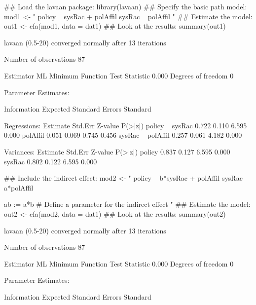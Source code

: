 \begin{Schunk}
\begin{Sinput}
 ## Load the lavaan package:
 library(lavaan)
 ## Specify the basic path model:
 mod1 <- "
 policy ~ sysRac + polAffil
 sysRac ~ polAffil
 "
 ## Estimate the model:
 out1 <- cfa(mod1, data = dat1)
 ## Look at the results:
 summary(out1)
\end{Sinput}
\begin{Soutput}
lavaan (0.5-20) converged normally after  13 iterations

  Number of observations                            87

  Estimator                                         ML
  Minimum Function Test Statistic                0.000
  Degrees of freedom                                 0

Parameter Estimates:

  Information                                 Expected
  Standard Errors                             Standard

Regressions:
                   Estimate  Std.Err  Z-value  P(>|z|)
  policy ~                                            
    sysRac            0.722    0.110    6.595    0.000
    polAffil          0.051    0.069    0.745    0.456
  sysRac ~                                            
    polAffil          0.257    0.061    4.182    0.000

Variances:
                   Estimate  Std.Err  Z-value  P(>|z|)
    policy            0.837    0.127    6.595    0.000
    sysRac            0.802    0.122    6.595    0.000
\end{Soutput}
\begin{Sinput}
 ## Include the indirect effect:
 mod2 <- "
 policy ~ b*sysRac + polAffil
 sysRac ~ a*polAffil
 
 ab := a*b # Define a parameter for the indirect effect
 "
 ## Estimate the model:
 out2 <- cfa(mod2, data = dat1)
 ## Look at the results:
 summary(out2)
\end{Sinput}
\begin{Soutput}
lavaan (0.5-20) converged normally after  13 iterations

  Number of observations                            87

  Estimator                                         ML
  Minimum Function Test Statistic                0.000
  Degrees of freedom                                 0

Parameter Estimates:

  Information                                 Expected
  Standard Errors                             Standard


\end{Soutput}
\end{Schunk}
